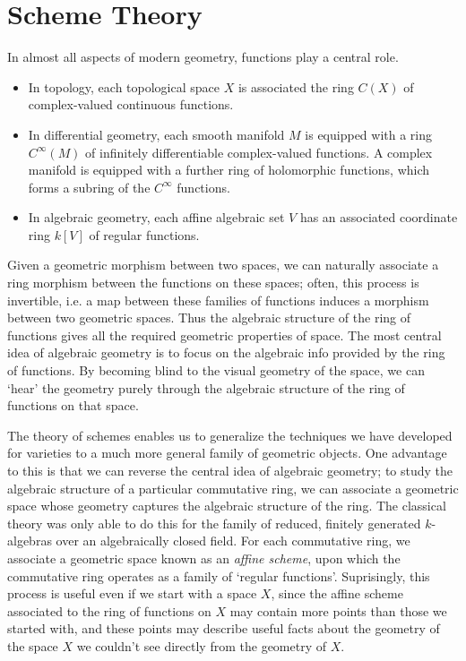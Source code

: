 \part{Scheme Theory}

In almost all aspects of modern geometry, functions play a central role.
%
\begin{itemize}
    \item In topology, each topological space $X$ is associated the ring $C(X)$ of complex-valued continuous functions.
    \item In differential geometry, each smooth manifold $M$ is equipped with a ring $C^\infty(M)$ of infinitely differentiable complex-valued functions. A complex manifold is equipped with a further ring of holomorphic functions, which forms a subring of the $C^\infty$ functions.
    \item In algebraic geometry, each affine algebraic set $V$ has an associated coordinate ring $k[V]$ of regular functions.
\end{itemize}
%
Given a geometric morphism between two spaces, we can naturally associate a ring morphism between the functions on these spaces; often, this process is invertible, i.e. a map between these families of functions induces a morphism between two geometric spaces. Thus the algebraic structure of the ring of functions gives all the required geometric properties of space. The most central idea of algebraic geometry is to focus on the algebraic info provided by the ring of functions. By becoming blind to the visual geometry of the space, we can `hear' the geometry purely through the algebraic structure of the ring of functions on that space.

The theory of schemes enables us to generalize the techniques we have developed for varieties to a much more general family of geometric objects. One advantage to this is that we can reverse the central idea of algebraic geometry; to study the algebraic structure of a particular commutative ring, we can associate a geometric space whose geometry captures the algebraic structure of the ring. The classical theory was only able to do this for the family of reduced, finitely generated $k$-algebras over an algebraically closed field. For each commutative ring, we associate a geometric space known as an \emph{affine scheme}, upon which the commutative ring operates as a family of `regular functions'. Suprisingly, this process is useful even if we start with a space $X$, since the affine scheme associated to the ring of functions on $X$ may contain more points than those we started with, and these points may describe useful facts about the geometry of the space $X$ we couldn't see directly from the geometry of $X$.

